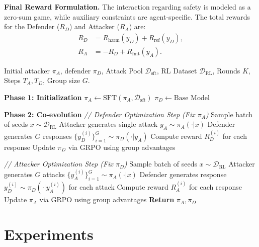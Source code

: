 \documentclass[11pt, letterpaper]{template}
\theoremstyle{plain}
\theoremstyle{definition}
\theoremstyle{remark}
\begin{document}
\textbf{Final Reward Formulation.}
The interaction regarding safety is modeled as a zero-sum game, while auxiliary constraints are agent-specific. The total rewards for the Defender ($R_D$) and Attacker ($R_A$) are:
\begin{align}
    R_D &= R_{\text{harm}}(y_D) + R_{\text{ref}}(y_D), \\
    R_A &= -R_D + R_{\text{fmt}}(y_A). %
\end{align}

\begin{algorithm}[t]
\caption{MAGIC Training Algorithm}
\label{alg:magic}
\begin{algorithmic}[1]
\REQUIRE 
Initial attacker $\pi_A$, defender $\pi_D$, Attack Pool $\mathcal{D}_{\text{sft}}$, RL Dataset $\mathcal{D}_{\text{RL}}$, Rounds $K$, Steps $T_A, T_D$, Group size $G$.

\STATE \textbf{Phase 1: Initialization}
\STATE $\pi_A \leftarrow \text{SFT}(\pi_A, \mathcal{D}_{\text{sft}})$
\STATE $\pi_D \leftarrow \text{Base Model}$

\STATE \textbf{Phase 2: Co-evolution}
    \STATE \textit{// Defender Optimization Step (Fix $\pi_A$)}
        \STATE Sample batch of seeds $x \sim \mathcal{D}_{\text{RL}}$
        \STATE Attacker generates single attack $y_A \sim \pi_A(\cdot|x)$
        \STATE Defender generates $G$ responses $\{y_D^{(i)}\}_{i=1}^G \sim \pi_D(\cdot|y_A)$
        \STATE Compute reward $R_D^{(i)}$ for each response
        \STATE Update $\pi_D$ via GRPO using group advantages
    \ENDFOR

    \STATE \textit{// Attacker Optimization Step (Fix $\pi_D$)}
        \STATE Sample batch of seeds $x \sim \mathcal{D}_{\text{RL}}$
        \STATE Attacker generates $G$ attacks $\{y_A^{(i)}\}_{i=1}^G \sim \pi_A(\cdot|x)$
        \STATE Defender generates response $y_D^{(i)} \sim \pi_D(\cdot|y_A^{(i)})$ for each attack
        \STATE Compute reward $R_A^{(i)}$ for each response
        \STATE Update $\pi_A$ via GRPO using group advantages
    \ENDFOR
\ENDFOR
\STATE \textbf{Return} $\pi_A, \pi_D$
\end{algorithmic}
\end{algorithm}

\section{Experiments}
\end{document}
